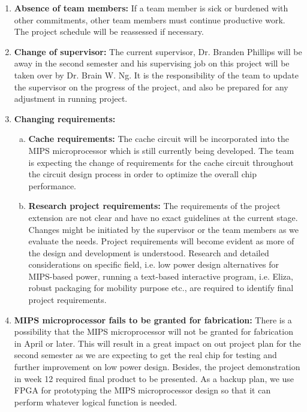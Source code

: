 \documentclass[a4paper,12pt]{article}
\begin{document}
\begin{enumerate}
\item \textbf{Absence of team members:} If a team member is sick or
	burdened with other commitments, other team members must
	continue productive work. The project schedule will be
	reassessed if necessary.

\item \textbf{Change of supervisor:} The current supervisor,
	Dr. Branden Phillips will be away in the second semester and
	his supervising job on this project will be taken over by
	Dr. Brain W. Ng. It is the responsibility of the team to
	update the supervisor on the progress of the project, and also
	be prepared for any adjustment in running project.

\item \textbf{Changing requirements:}
  \begin{enumerate}[a)]
  \item \textbf{Cache requirements:} The cache circuit will be
	incorporated into the MIPS microprocessor which is still
	currently being developed. The team is expecting the change of
	requirements for the cache circuit throughout the circuit
	design process in order to optimize the overall chip
	performance.

  \item \textbf{Research project requirements:} The requirements of
	the project extension are not clear and have no exact
	guidelines at the current stage. Changes might be initiated by
	the supervisor or the team members as we evaluate the
	needs. Project requirements will become evident as more of the
	design and development is understood. Research and detailed
	considerations on specific field, i.e. low power design
	alternatives for MIPS-based power, running a text-based
	interactive program, i.e. Eliza, robust packaging for mobility
	purpose etc., are required to identify final project
	requirements.
  \end{enumerate}

\item \textbf{MIPS microprocessor fails to be granted for
	fabrication:} There is a possibility that the MIPS
	microprocessor will not be granted for fabrication in April or
	later. This will result in a great impact on out project plan
	for the second semester as we are expecting to get the real
	chip for testing and further improvement on low power
	design. Besides, the project demonstration in week 12 required
	final product to be presented. As a backup plan, we use FPGA
	for prototyping the MIPS microprocessor design so that it can
	perform whatever logical function is needed.
\end{enumerate}
\end{document}
